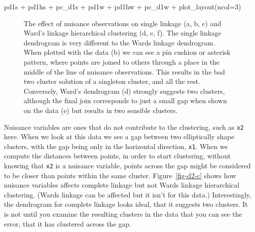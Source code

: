 \documentclass[
  letterpaper,
]{krantz}
\newenvironment{Shaded}{\begin{snugshade}}{\end{snugshade}}
\newcommand{\AttributeTok}[1]{\textcolor[rgb]{0.40,0.45,0.13}{#1}}
\newcommand{\DecValTok}[1]{\textcolor[rgb]{0.68,0.00,0.00}{#1}}
\newcommand{\FunctionTok}[1]{\textcolor[rgb]{0.28,0.35,0.67}{#1}}
\newcommand{\NormalTok}[1]{\textcolor[rgb]{0.00,0.23,0.31}{#1}}
\newcommand{\SpecialCharTok}[1]{\textcolor[rgb]{0.37,0.37,0.37}{#1}}
\begin{document}
\begin{Shaded}
\begin{Highlighting}[]
\NormalTok{pd1s }\SpecialCharTok{+}\NormalTok{ pd1hs }\SpecialCharTok{+}\NormalTok{ pc\_d1s }\SpecialCharTok{+} 
\NormalTok{  pd1w }\SpecialCharTok{+}\NormalTok{ pd1hw }\SpecialCharTok{+}\NormalTok{ pc\_d1w }\SpecialCharTok{+}
  \FunctionTok{plot\_layout}\NormalTok{(}\AttributeTok{ncol=}\DecValTok{3}\NormalTok{)}
\end{Highlighting}
\end{Shaded}

\begin{figure}[H]


\caption{\label{fig-d1-s}The effect of nuisance observations on single
linkage (a, b, c) and Ward's linkage hierarchical clustering (d, e, f).
The single linkage dendrogram is very different to the Wards linkage
dendrogram. When plotted with the data (b) we can see a pin cushion or
asterisk pattern, where points are joined to others through a place in
the middle of the line of nuisance observations. This results in the bad
two cluster solution of a singleton cluster, and all the rest.
Conversely, Ward's dendrogram (d) strongly suggests two clusters,
although the final join corresponds to just a small gap when shown on
the data (e) but results in two sensible clusters.}

\end{figure}%

Nuisance variables are ones that do not contribute to the clustering,
such as \texttt{x2} here. When we look at this data we see a gap between
two elliptically shape clusters, with the gap being only in the
horizontal direction, \texttt{x1}. When we compute the distances between
points, in order to start clustering, without knowing that \texttt{x2}
is a nuisance variable, points across the gap might be considered to be
closer than points within the same cluster. Figure~\ref{fig-d2-c} shows
how nuisance variables affects complete linkage but not Wards linkage
hierarchical clustering. (Wards linkage can be affected but it isn't for
this data.) Interestingly, the dendrogram for complete linkage looks
ideal, that it suggests two clusters. It is not until you examine the
resulting clusters in the data that you can see the error, that it has
clustered across the gap.
\end{document}
